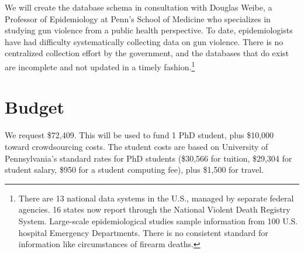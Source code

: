 \documentclass[11pt]{article}
\begin{document}
We will create the database schema in consultation with Douglas Weibe, a Professor of Epidemiology  at Penn's School of Medicine who specializes in studying gun violence from a public health perspective.   To date, epidemiologists have had difficulty  systematically collecting data on gun violence.  There is no centralized collection effort by the government, and the databases that do exist are incomplete and not updated in a timely fashion.\footnote{
There are 13 national data systems in the U.S., managed by separate federal agencies. 16 states now report through the National Violent Death Registry System.  Large-scale epidemiological studies sample information from 100 U.S. hospital Emergency Departments.   There is no consistent standard for information like circumstances of firearm deaths.
} 




\section{Budget}

We request \$72,409.  This will be used to fund 1 PhD student, plus \$10,000 toward crowdsourcing costs.  The student costs are based on
University of Pennsylvania's standard rates for PhD students (\$30,566 for tuition, \$29,304 for student salary, \$950 for a student computing fee), plus \$1,500 for travel.  
\end{document}
